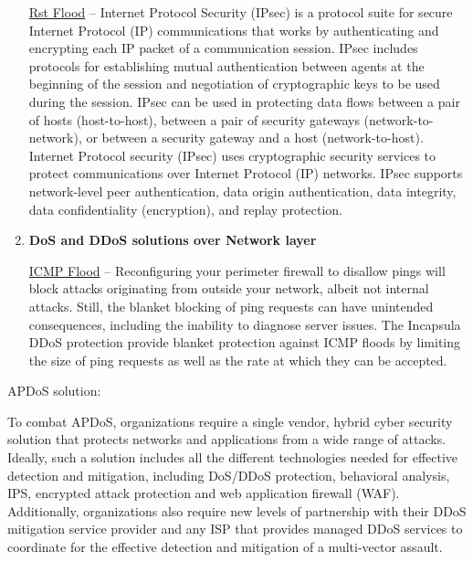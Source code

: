 \documentclass{article}
\begin{document}
\begin{enumerate}
 \hfill \break \underline{Rst Flood} – Internet Protocol Security (IPsec) is a protocol suite for secure Internet Protocol (IP) communications that works by authenticating and encrypting each IP packet of a communication session. IPsec includes protocols for establishing mutual authentication between agents at the beginning of the session and negotiation of cryptographic keys to be used during the session. IPsec can be used in protecting data flows between a pair of hosts (host-to-host), between a pair of security gateways (network-to-network), or between a security gateway and a host (network-to-host). Internet Protocol security (IPsec) uses cryptographic security services to protect communications over Internet Protocol (IP) networks. IPsec supports network-level peer authentication, data origin authentication, data integrity, data confidentiality (encryption), and replay protection.

\item \textbf{DoS and DDoS solutions over Network layer} 

 \hfill \break \underline{ICMP Flood} – Reconfiguring your perimeter firewall to disallow pings will block attacks originating from outside your network, albeit not internal attacks. Still, the blanket blocking of ping requests can have unintended consequences, including the inability to diagnose server issues.
The Incapsula DDoS protection provide blanket protection against ICMP floods by limiting the size of ping requests as well as the rate at which they can be accepted.


\end{enumerate}

 \hfill \break  APDoS solution:

 \hfill \break To combat APDoS, organizations require a single vendor, hybrid cyber security solution that protects networks and applications from a wide range of attacks. Ideally, such a solution includes all the different technologies needed for effective detection and mitigation, including DoS/DDoS protection, behavioral analysis, IPS, encrypted attack protection and web application firewall (WAF). Additionally, organizations also require new levels of partnership with their DDoS mitigation service provider and any ISP that provides managed DDoS services to coordinate for the effective detection and mitigation of a multi-vector assault.
\end{document}
